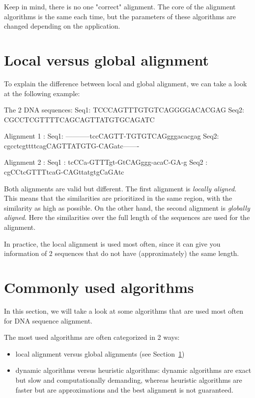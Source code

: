 Keep in mind, there is no one "correct" alignment. The core of the alignment algorithms is the same each time, but the parameters of these algorithms are changed depending on the application.

\section{Local versus global alignment}
\label{S:localVSglobalAlignment}

To explain the difference between local and global alignment, we can take a look at the following example:

\begin{lcverbatim}
The 2 DNA sequences:
Seq1: TCCCAGTTTGTGTCAGGGGACACGAG
Seq2: CGCCTCGTTTTCAGCAGTTATGTGCAGATC

Alignment 1 :
Seq1: -----------tccCAGTT-TGTGTCAGgggacacgag
Seq2: cgcctcgttttcagCAGTTATGTG-CAGatc-------

Alignment 2 :
Seq1 : tcCCa-GTTTgt-GtCAGggg-acaC-GA-g
Seq2 : cgCCtcGTTTtcaG-CAGttatgtgCaGAtc
\end{lcverbatim}

Both alignments are valid but different. The first alignment is \emph{locally aligned}. This means that the similarities are prioritized in the same region, with the similarity as high as possible. On the other hand, the second alignment is \emph{globally aligned}. Here the similarities over the full length of the sequences are used for the alignment. 

In practice, the local alignment is used most often, since it can give you information of 2 sequences that do not have (approximately) the same length.

\section{Commonly used algorithms}

In this section, we will take a look at some algorithms that are used most often for DNA sequence alignment.


The most used algorithms are often categorized in 2 ways: 

\begin{itemize}
	\item local alignment versus global alignments (see Section~\ref{S:localVSglobalAlignment})
	\item dynamic algorithms versus heuristic algorithms: dynamic algorithms are exact but slow and computationally demanding, whereas heuristic algorithms are faster but are approximations and the best alignment is not guaranteed.
\end{itemize}

